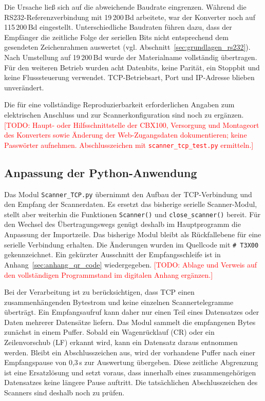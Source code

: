 Die Ursache ließ sich auf die abweichende Baudrate eingrenzen. Während die RS232-Referenzverbindung mit 19\,200\,Bd arbeitete, war der Konverter noch auf 115\,200\,Bd eingestellt. Unterschiedliche Baudraten führen dazu, dass der Empfänger die zeitliche Folge der seriellen Bits nicht entsprechend dem gesendeten Zeichenrahmen auswertet (vgl. Abschnitt~\ref{sec:grundlagen_rs232}). Nach Umstellung auf 19\,200\,Bd wurde der Materialname vollständig übertragen. Für den weiteren Betrieb wurden acht Datenbits, keine Parität, ein Stoppbit und keine Flusssteuerung verwendet. TCP-Betriebsart, Port und IP-Adresse blieben unverändert.

Die für eine vollständige Reproduzierbarkeit erforderlichen Angaben zum elektrischen Anschluss und zur Scannerkonfiguration sind noch zu ergänzen. \textcolor{red}{[TODO: Haupt- oder Hilfsschnittstelle der CBX100, Versorgung und Montageort des Konverters sowie Änderung der Web-Zugangsdaten dokumentieren; keine Passwörter aufnehmen. Abschlusszeichen mit \texttt{scanner\_tcp\_test.py} ermitteln.]}

\subsection{Anpassung der Python-Anwendung}
\label{sec:qr_python}

Das Modul \texttt{Scanner\_TCP.py} übernimmt den Aufbau der TCP-Verbindung und den Empfang der Scannerdaten. Es ersetzt das bisherige serielle Scanner-Modul, stellt aber weiterhin die Funktionen \texttt{Scanner()} und \texttt{close\_scanner()} bereit. Für den Wechsel des Übertragungswegs genügt deshalb im Hauptprogramm die Anpassung der Importzeile. Das bisherige Modul bleibt als Rückfallebene für eine serielle Verbindung erhalten. Die Änderungen wurden im Quellcode mit \texttt{\# T3X00} gekennzeichnet. Ein gekürzter Ausschnitt der Empfangsschleife ist in Anhang~\ref{sec:anhang_qr_code} wiedergegeben. \textcolor{red}{[TODO: Ablage und Verweis auf den vollständigen Programmstand im digitalen Anhang ergänzen.]}

Bei der Verarbeitung ist zu berücksichtigen, dass TCP einen zusammenhängenden Bytestrom und keine einzelnen Scannertelegramme überträgt. Ein Empfangsaufruf kann daher nur einen Teil eines Datensatzes oder Daten mehrerer Datensätze liefern. Das Modul sammelt die empfangenen Bytes zunächst in einem Puffer. Sobald ein Wagenrücklauf (CR) oder ein Zeilenvorschub (LF) erkannt wird, kann ein Datensatz daraus entnommen werden. Bleibt ein Abschlusszeichen aus, wird der vorhandene Puffer nach einer Empfangspause von 0,3\,s zur Auswertung übergeben. Diese zeitliche Abgrenzung ist eine Ersatzlösung und setzt voraus, dass innerhalb eines zusammengehörigen Datensatzes keine längere Pause auftritt. Die tatsächlichen Abschlusszeichen des Scanners sind deshalb noch zu prüfen.

